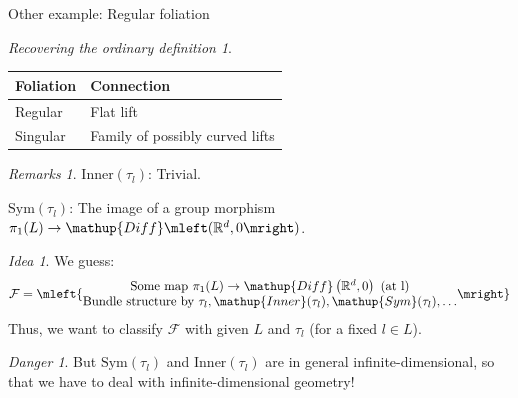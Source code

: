 \documentclass[hyperref={pdfpagelabels=false}]{beamer}
\def\bes{\begin{equation*}}
\def\ees{\end{equation*}}
\theoremstyle{plain}
\theoremstyle{remark}
\newtheorem*{remark}{Remarks}
\newtheorem*{idea}{Idea}
\newtheorem*{danger}{Danger}
\newtheorem*{BackToTheRoots}{Recovering the ordinary definition}
\begin{document}
{

\begin{frame}{Other example: Regular foliation}
\begin{figure}
\end{figure}

\begin{BackToTheRoots}
	\centering
		\begin{tabular}{l|l}
			Foliation & Connection \\ \hline
			Regular & Flat lift \\
			Singular & Family of possibly curved lifts
		\end{tabular}
\end{BackToTheRoots}

\begin{remark}
$\mathup{Inner}(\tau_l)$: Trivial.

$\mathup{Sym}(\tau_l)$: The image of a group morphism $\pi_1(L) \to \mathup{Diff}\mleft( \mathbb{R}^d, 0 \mright)$.
\end{remark}
\end{frame}

\begin{frame}
\begin{idea}
	We guess:
	\bes
		\mathcal{F}
		=
		\mleft\{
			\begin{matrix}
				\text{Some map } \pi_1(L) \to \mathup{Diff}\left( \mathbb{R}^d, 0 \right) \text{ (at l)}
				\\
				\text{Bundle structure by } \tau_l, \mathup{Inner}(\tau_l), \mathup{Sym}(\tau_l), \dots
			\end{matrix}
		\mright\}
	\ees
	Thus, we want to classify $\mathcal{F}$ with given $L$ and $\tau_l$ (for a fixed $l \in L$).
\end{idea}

\pause

\begin{danger}
But $\mathup{Sym}(\tau_l)$ and $\mathup{Inner}(\tau_l)$ are in general infinite-dimensional, so that we have to deal with infinite-dimensional geometry!
\end{danger}
\end{frame}

}
\end{document}
